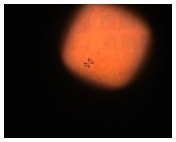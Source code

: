 \begin{figure}[ht]
\begin{subfigure}{0.3\linewidth}
      \includegraphics[width=\linewidth]{data/Gruppe2/image_5.png}
      \caption{}
      \label{fig:subfig6}
    \end{subfigure}



\end{figure}
